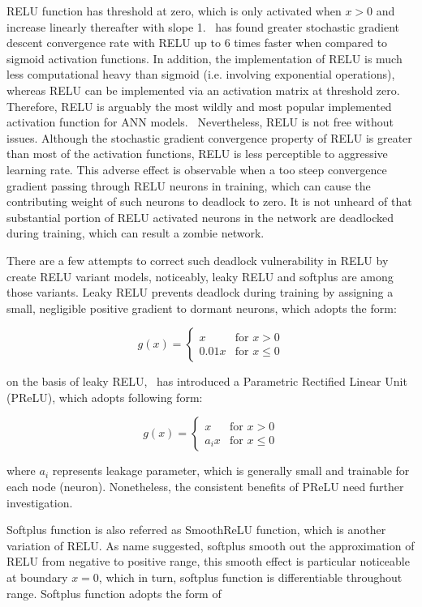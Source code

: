 \begin{enumerate}
RELU function has threshold at zero, which is only activated when $x > 0$ and increase linearly thereafter with slope 1.~\citet{Krizhevsky_2017} has found greater stochastic gradient descent convergence rate with RELU up to 6 times faster when compared to sigmoid activation functions. In addition, the implementation of RELU is much less computational heavy than sigmoid (i.e. involving exponential operations), whereas RELU can be implemented via an activation matrix at threshold zero. Therefore, RELU is arguably the most wildly and most popular implemented activation function for ANN models.~\cite{Bengio_2012,Toth_2013,Jaitly_2011,nga,LeCun_2015,}  Nevertheless, RELU is not free without issues. Although the stochastic gradient convergence property of RELU is greater than most of the activation functions, RELU is less perceptible to aggressive learning rate. This adverse effect is observable when a too steep convergence gradient passing through RELU neurons in training, which can cause the contributing weight of such neurons to deadlock to zero. It is not unheard of that substantial portion of RELU activated neurons in the network are deadlocked during training, which can result a zombie network. 
\par 
There are a few attempts to correct such deadlock vulnerability in RELU by create RELU variant models, noticeably, leaky RELU and softplus are among those variants. Leaky RELU prevents deadlock during training by assigning a small, negligible positive gradient to dormant neurons, which adopts the form: 

\begin{equation}
    g(x) = \left\{ 
    \begin{array}{lr}
        x & \text{for } x > 0 \\
        0.01x & \text{for } x\leq 0
    \end{array}\right.
\end{equation}

on the basis of leaky RELU,~\citet{He_2015} has introduced a Parametric Rectified Linear Unit (PReLU), which adopts following form:

\begin{equation}
    g(x) = \left\{ 
    \begin{array}{lr}
        x & \text{for } x > 0 \\
        a_{i}x & \text{for } x\leq 0
    \end{array}\right.
\end{equation}

where $a_{i}$ represents leakage parameter, which is generally small and trainable for each node (neuron). Nonetheless, the consistent benefits of PReLU need further investigation. 
\par 
Softplus function is also referred as SmoothReLU function, which is another variation of RELU. As name suggested, softplus smooth out the approximation of RELU from negative to positive range, this smooth effect is particular noticeable at boundary $x=0$, which in turn, softplus function is differentiable throughout range. Softplus function adopts the form of   


\end{enumerate}
